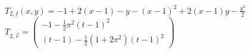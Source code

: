 {\begin{abc}
\end{abc}
}

{
$T_{2,f}(x,y)= -1 + 2(x-1)-y - (x-1)^2 + 2 (x-1)y -\frac {y^2}2$\\
$T_{2,\vec r}= \begin{pmatrix}-1 -\frac 12 \pi^2(t-1)^2\\(t-1)-\frac 12(1+2\pi^2)(t-1)^2\end{pmatrix}$


}

